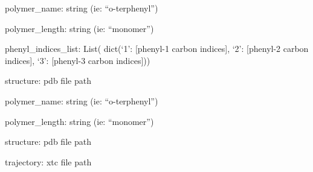\documentclass[letterpaper,12pt,english,openany,oneside]{sphinxmanual}
\begin{document}

\begin{fulllineitems}
\label{\detokenize{analysis:analysis.get_phenyl_carbon_indices}}
polymer\_name: string (ie: “o-terphenyl”)

polymer\_length: string (ie: “monomer”)

phenyl\_indices\_list: List( dict(‘1’: {[}phenyl-1 carbon indices{]}, ‘2’: {[}phenyl-2 carbon indices{]}, ‘3’: {[}phenyl-3 carbon indices{]}))

\end{fulllineitems}


\begin{fulllineitems}
\label{\detokenize{analysis:analysis.get_phenyl_centers_of_mass}}
structure: pdb file path

polymer\_name: string (ie: “o-terphenyl”)

polymer\_length: string (ie: “monomer”)

\end{fulllineitems}


\begin{fulllineitems}
\label{\detokenize{analysis:analysis.read_trajectory}}
structure: pdb file path

trajectory: xtc file path

\end{fulllineitems}



\renewcommand{\indexname}{Python Module Index}
\begin{sphinxtheindex}
\let\bigletter\sphinxstyleindexlettergroup
\bigletter{a}
\item\relax{}
\indexspace
\bigletter{s}
\item\relax{}
\end{sphinxtheindex}

\renewcommand{\indexname}{Index}
\printindex
\end{document}
